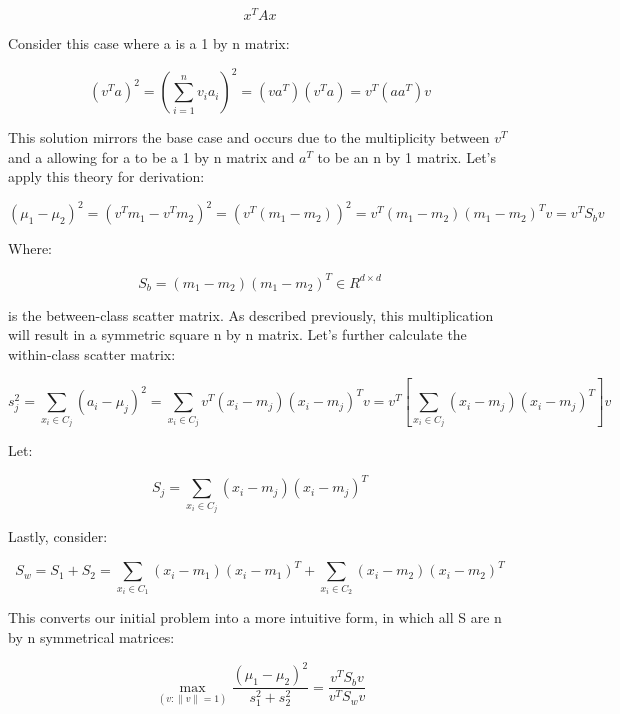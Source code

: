 \documentclass{article}
\begin{document}
\begin{equation*}
x^T A x
\end{equation*}

Consider this case where a is a 1 by n matrix:

\begin{equation*}
(v^T a)^2 = \left( \sum_{i=1}^{n} v_i a_i \right)^2 = (v a^T)(v^T a) = v^T (a a^T) v
\end{equation*}

This solution mirrors the base case and occurs due to the multiplicity between $v^T$ and a allowing for a to be a 1 by n matrix and $a^T$ to be an n by 1 matrix. Let's apply this theory for derivation:

\begin{equation*}
(\mu_1 - \mu_2)^2 = (v^T m_1 - v^T m_2)^2 = (v^T (m_1 - m_2))^2 = v^T (m_1 - m_2)(m_1 - m_2)^T v = v^T S_b v
\end{equation*}

Where:

\begin{equation*}
S_b = (m_1 - m_2)(m_1 - m_2)^T \in R^{d \times d}
\end{equation*}

is the between-class scatter matrix. As described previously, this multiplication will result in a symmetric square n by n matrix. Let's further calculate the within-class scatter matrix:

\begin{equation*}
s_j^2 = \sum_{x_i \in C_j} (a_i - \mu_j)^2 = \sum_{x_i \in C_j} v^T (x_i - m_j)(x_i - m_j)^T v = v^T \left[ \sum_{x_i \in C_j} (x_i - m_j)(x_i - m_j)^T \right] v
\end{equation*}

Let:

\begin{equation*}
S_j = \sum_{x_i \in C_j} (x_i - m_j)(x_i - m_j)^T
\end{equation*}

Lastly, consider:

\begin{equation*}
S_w = S_1 + S_2 = \sum_{x_i \in C_1} (x_i - m_1)(x_i - m_1)^T + \sum_{x_i \in C_2} (x_i - m_2)(x_i - m_2)^T
\end{equation*}

This converts our initial problem into a more intuitive form, in which all S are n by n symmetrical matrices:

\begin{equation*}
\max_{(v: \|v\| = 1)} \frac{(\mu_1 - \mu_2)^2}{s_1^2 + s_2^2} = \frac{v^T S_b v}{v^T S_w v}
\end{equation*}
\end{document}
